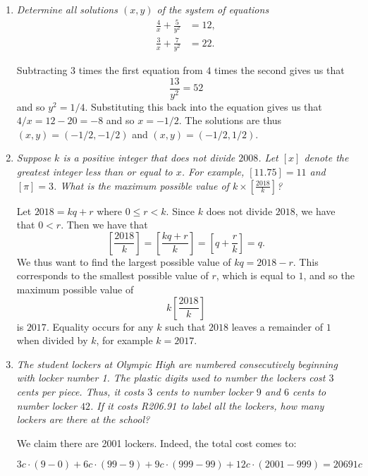 \documentclass{article}
\begin{document}
\begin{enumerate}[1.]
\vspace{6pt}
\item 
\textit{Determine all solutions $(x,y)$ of the system of equations
\begin{align*}
  \frac{4}{x} +\frac{5}{y^2} &= 12, \\
  \frac{3}{x} +\frac{7}{y^2} &= 22.
\end{align*}}

Subtracting $3$ times the first equation from $4$ times the second gives us that
\[
	\frac{13}{y^2} = 52
\]
and so $y^2 = 1/4$. Substituting this back into the equation gives us that $4/x = 12 - 20 = -8$ and so $x = -1/2$. The solutions are thus $(x, y) = (-1/2, -1/2)$ and $(x, y) = (-1/2, 1/2)$.

\item 
\textit{Suppose $k$ is a positive integer that does not divide $2008$. Let $[x]$ denote the greatest integer less than or equal to $x$. For example, $[11.75] = 11$ and $[\pi] = 3$. What is the maximum possible value of $k \times \left[\frac{2018}{k}\right]$?}

Let $2018 = kq + r$ where $0 \leq r < k$. Since $k$ does not divide $2018$, we have that $0 < r$. Then we have that
\[
	\left[ \frac{2018}{k} \right] = \left[ \frac{kq + r}{k} \right] = \left[ q + \frac{r}{k} \right] = q.
\]
We thus want to find the largest possible value of $kq = 2018 - r$. This corresponds to the smallest possible value of $r$, which is equal to $1$, and so the maximum possible value of
\[
	k \left[ \frac{2018}{k} \right]
\]
is $2017$. Equality occurs for any $k$ such that $2018$ leaves a remainder of $1$ when divided by $k$, for example $k = 2017$.


\vspace{6pt}
\item %
\textit{The student lockers at Olympic High are numbered consecutively beginning with locker number 1. The plastic digits used to number the lockers cost $3$ cents per piece. Thus, it costs $3$ cents to number locker $9$ and $6$ cents to number locker $42$. If it costs R206.91 to label all the lockers, how many lockers are there at the school?}

We claim there are 2001 lockers. Indeed, the total cost comes to:

\begin{equation*}
    3c \cdot (9 - 0) + 6c \cdot (99 - 9) + 9c \cdot (999 - 99) + 12c \cdot (2001 - 999) = 20691c
\end{equation*}

\vspace{5mm}


\end{enumerate}
\end{document}
